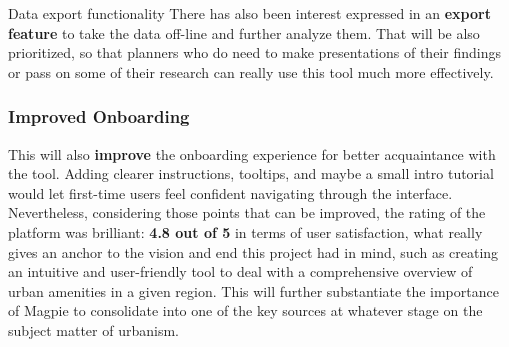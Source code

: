 Data export functionality There has also been interest expressed in an \textbf{export feature} to take the data off{-}line and further analyze them. That will be also prioritized, so that planners who do need to make presentations of their findings or pass on some of their research can really use this tool much more effectively.

\subsubsection{Improved Onboarding}

This will also \textbf{improve} the onboarding experience for better acquaintance with the tool. Adding clearer instructions, tooltips, and maybe a small intro tutorial would let first{-}time users feel confident navigating through the interface. Nevertheless, considering those points that can be improved, the rating of the platform was brilliant: \textbf{4.8 out of 5} in terms of user satisfaction, what really gives an anchor to the vision and end this project had in mind, such as creating an intuitive and user{-}friendly tool to deal with a comprehensive overview of urban amenities in a given region. This will further substantiate the importance of Magpie to consolidate into one of the key sources at whatever stage on the subject matter of urbanism.